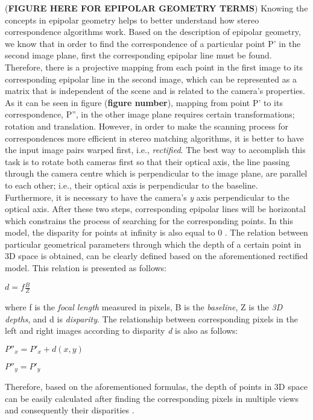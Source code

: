 \documentclass[dvips,letterpaper,12pt]{report}
\begin{document}
(\textbf{FIGURE HERE FOR EPIPOLAR GEOMETRY TERMS}) 
\newline 
Knowing the concepts in epipolar geometry helps to better understand how stereo correspondence algorithms work. Based on the description of epipolar geometry, 
we know that in order to find the correspondence of a particular point P' in the second image plane, first the corresponding epipolar line must be found. 
Therefore, there is a projective mapping from each point in the first image 
to its corresponding epipolar line in the second image, which can be represented as a matrix that is independent of the scene and is related to the camera's properties.\cite{hart2000} As it can be
seen in figure (\textbf{figure number}), mapping from point P' to its correspondence, P'', in the other image plane requires certain transformations; rotation and translation. However, in order
to make the scanning process for correspondences more efficient in stereo matching algorithms, 
it is better to have the input image pairs warped first, i.e., {\it rectified}. The best way to accomplish this task is to
rotate both cameras first so that their optical axis, the line passing through the camera centre which is perpendicular to the image plane, are parallel to each other; 
i.e., their optical axis is perpendicular to the baseline. Furthermore, it is necessary to have the camera's {\it y} axis perpendicular to the optical axis. After these two steps,
corresponding epipolar lines will be horizontal which constrains the process of searching for the corresponding points. 
In this model, the disparity for points at infinity is also equal to 0 \cite{sze11}.
The relation between particular geometrical parameters through which the depth of a certain point in 3D space is obtained, can be clearly defined based on the aforementioned rectified model. 
This relation is presented as follows:
\begin{center}
$d = f\frac{B}{Z}$
\end{center}
where f is the {\it focal length} measured in pixels, B is the {\it baseline}, Z is the {\it 3D depths}, and d is {\it disparity}. The relationship between corresponding pixels in the left
and right images according to disparity {\it d} is also as follows:
\begin{center}
${P}''_{x}={P}'_{x}+d(x,y)$

${P}''_{y} = {P}'_{y}$
\end{center}
Therefore, based on the aforementioned formulas, the depth of points in 3D space can be easily calculated after finding the corresponding pixels in multiple views and consequently their
disparities \cite{bol87,oku93,sch02}.
\end{document}
